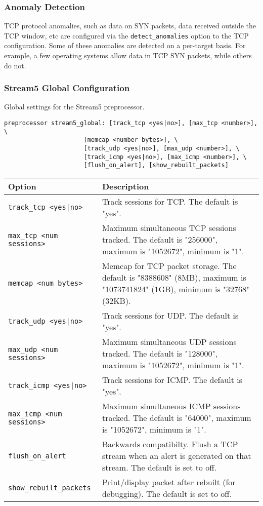 \documentclass[english]{report}
\begin{document}
\subsubsection{Anomaly Detection}

TCP protocol anomalies, such as data on SYN packets, data received
outside the TCP window, etc are configured via the \texttt{detect\_anomalies}
option to the TCP configuration.  Some of these anomalies are
detected on a per-target basis.  For example, a few operating systems
allow data in TCP SYN packets, while others do not.

\subsubsection{Stream5 Global Configuration}

Global settings for the Stream5 preprocessor.

\begin{verbatim}
preprocessor stream5_global: [track_tcp <yes|no>], [max_tcp <number>], \
                      [memcap <number bytes>], \
                      [track_udp <yes|no>], [max_udp <number>], \
                      [track_icmp <yes|no>], [max_icmp <number>], \
                      [flush_on_alert], [show_rebuilt_packets]
\end{verbatim}

\begin{tabular}{| l | p{3.5in} |}
\hline
\textbf{Option} & \textbf{Description}\\
\hline 
\hline 
\texttt{track\_tcp <yes|no>} & Track sessions for TCP.  The default is "yes".\\
\hline
\texttt{max\_tcp <num sessions>} & Maximum simultaneous TCP sessions tracked.  The default is "256000", maximum is "1052672", minimum is "1".\\
\hline
\texttt{memcap <num bytes>} & Memcap for TCP packet storage.  The default is "8388608" (8MB), maximum is "1073741824" (1GB), minimum is "32768" (32KB).\\
\hline
\texttt{track\_udp <yes|no>} & Track sessions for UDP.  The default is "yes".\\
\hline
\texttt{max\_udp <num sessions>} & Maximum simultaneous UDP sessions tracked.  The default is "128000", maximum is "1052672", minimum is "1".\\
\hline
\texttt{track\_icmp <yes|no>} & Track sessions for ICMP.  The default is "yes".\\
\hline
\texttt{max\_icmp <num sessions>} & Maximum simultaneous ICMP sessions tracked.  The default is "64000", maximum is "1052672", minimum is "1".\\
\hline
\texttt{flush\_on\_alert} & Backwards compatibilty.  Flush a TCP stream when an alert is generated on that stream.  The default is set to off.\\
\hline
\texttt{show\_rebuilt\_packets} & Print/display packet after rebuilt (for debugging).  The default is set to off.\\
\hline
\end{tabular}
\end{document}
